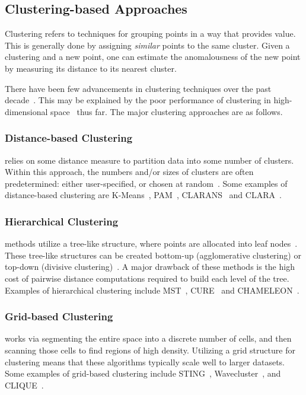 \subsection{Clustering-based Approaches}
\label{subsec:introduction:clustering-based-approaches}

Clustering refers to techniques for grouping points in a way that provides value.
This is generally done by assigning \textit{similar} points to the same cluster.
Given a clustering and a new point, one can estimate the anomalousness of the new point by measuring its distance to its nearest cluster.

There have been few advancements in clustering techniques over the past decade~\cite{wang2019progress}.
This may be explained by the poor performance of clustering in high-dimensional space~\cite{zhang2013advancements} thus far.
The major clustering approaches are as follows.

\subsubsection{Distance-based Clustering}
\label{subsubsec:introduction:clustering-based-approaches:distance-based-clustering}
relies on some distance measure to partition data into some number of clusters.
Within this approach, the numbers and/or sizes of clusters are often predetermined: either user-specified, or chosen at random~\cite{wang2019progress}.
Some examples of distance-based clustering are
K-Means~\cite{macqueen1967some},
PAM~\cite{kaufman2009finding},
CLARANS~\cite{ng1994efficient} and
CLARA~\cite{kaufman2009finding}.

\subsubsection{Hierarchical Clustering}
\label{subsubsec:introduction:clustering-based-approaches:hierarchical-clustering}
methods utilize a tree-like structure, where points are allocated into leaf nodes~\cite{wang2019progress}.
These tree-like structures can be created bottom-up (agglomerative clustering) or top-down (divisive clustering)~\cite{agrawal1998automatic}.
A major drawback of these methods is the high cost of pairwise distance computations required to build each level of the tree.
Examples of hierarchical clustering include
MST~\cite{charles_zahn_graph_1971},
CURE~\cite{guha1998cure} and
CHAMELEON~\cite{karypis1999hierarchical}.

\subsubsection{Grid-based Clustering}
\label{subsubsec:introduction:clustering-based-approaches:grid-based-clustering}
works via segmenting the entire space into a discrete number of cells, and then scanning those cells to find regions of high density.
Utilizing a grid structure for clustering means that these algorithms typically scale well to larger datasets.
Some examples of grid-based clustering include
STING~\cite{wang1997sting},
Wavecluster~\cite{sheikholeslami2000wavecluster}, and
CLIQUE~\cite{agrawal1998automatic}.

